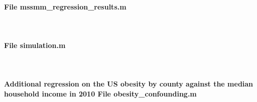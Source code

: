 \documentclass[11pt]{article}
\begin{document}
\paragraph{File mssmm\_regression\_results.m} \


\paragraph{File simulation.m} \


\paragraph{Additional regression on the US obesity by county against the median household income in 2010 File obesity\_confounding.m} \

\end{document}
